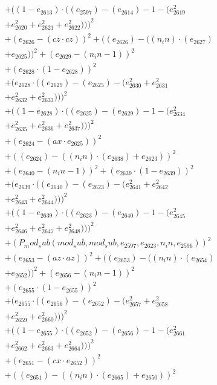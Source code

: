 \documentclass[10pt, a4paper]{article}
\begin{document}
\begin{small}
\begin{align*}
& + ((1 - e_{2613})  \cdot  ((e_{2597}) - (e_{2614}) - 1 - (e_{2619}^{2} \\
& + e_{2620}^{2} + e_{2621}^{2} + e_{2622}^{2})))^{2} \\
& + (e_{2626} - (cz  \cdot  cz))^{2} + ((e_{2626}) - ((n_in)  \cdot  (e_{2627}) \\
& + e_{2625}))^{2} + (e_{2629} - (n_in - 1))^{2} \\
& + (e_{2628}  \cdot  (1 - e_{2628}))^{2} \\
& + (e_{2628}  \cdot  ((e_{2629}) - (e_{2625}) - (e_{2630}^{2} + e_{2631}^{2} \\
& + e_{2632}^{2} + e_{2633}^{2})))^{2} \\
& + ((1 - e_{2628})  \cdot  ((e_{2625}) - (e_{2629}) - 1 - (e_{2634}^{2} \\
& + e_{2635}^{2} + e_{2636}^{2} + e_{2637}^{2})))^{2} \\
& + (e_{2624} - (ax  \cdot  e_{2625}))^{2} \\
& + ((e_{2624}) - ((n_in)  \cdot  (e_{2638}) + e_{2623}))^{2} \\
& + (e_{2640} - (n_in - 1))^{2} + (e_{2639}  \cdot  (1 - e_{2639}))^{2} \\
& + (e_{2639}  \cdot  ((e_{2640}) - (e_{2623}) - (e_{2641}^{2} + e_{2642}^{2} \\
& + e_{2643}^{2} + e_{2644}^{2})))^{2} \\
& + ((1 - e_{2639})  \cdot  ((e_{2623}) - (e_{2640}) - 1 - (e_{2645}^{2} \\
& + e_{2646}^{2} + e_{2647}^{2} + e_{2648}^{2})))^{2} \\
& + (P_mod_sub(mod_sub, mod_sub, e_{2597}, e_{2623}, n_in, e_{2596}))^{2} \\
& + (e_{2653} - (az  \cdot  az))^{2} + ((e_{2653}) - ((n_in)  \cdot  (e_{2654}) \\
& + e_{2652}))^{2} + (e_{2656} - (n_in - 1))^{2} \\
& + (e_{2655}  \cdot  (1 - e_{2655}))^{2} \\
& + (e_{2655}  \cdot  ((e_{2656}) - (e_{2652}) - (e_{2657}^{2} + e_{2658}^{2} \\
& + e_{2659}^{2} + e_{2660}^{2})))^{2} \\
& + ((1 - e_{2655})  \cdot  ((e_{2652}) - (e_{2656}) - 1 - (e_{2661}^{2} \\
& + e_{2662}^{2} + e_{2663}^{2} + e_{2664}^{2})))^{2} \\
& + (e_{2651} - (cx  \cdot  e_{2652}))^{2} \\
& + ((e_{2651}) - ((n_in)  \cdot  (e_{2665}) + e_{2650}))^{2} \\

\end{align*}
\end{small}
\end{document}
